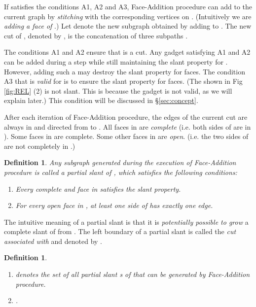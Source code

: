 \documentclass[11pt]{article}
\newtheorem{definition}[figure]{Definition}
\begin{document}
If  satisfies the conditions A1, A2 and A3, Face-Addition
procedure can add  to the current graph  by {\em stitching}
 with the corresponding vertices on . (Intuitively we are
{\em adding a face of }.) Let  denote the new subgraph
obtained by adding  to . The new cut of ,
denoted by , is the concatenation of three subpaths
.

The conditions A1 and A2 ensure that  is a cut. Any gadget
 satisfying A1 and A2 can be added during a step while still maintaining
the slant property for . However, adding such a  may destroy the
slant property for  faces. The condition A3 that  is {\em valid}
for  is to ensure the slant property for  faces. (The 
shown in Fig \ref{fig:REL} (2) is not slant. This is because the gadget
 is not valid, as we will explain later.)
This condition will be discussed in \S \ref{sec:concept}.

After each iteration of Face-Addition procedure, the edges of
the current cut  are always in  and directed from 
to . All  faces  in  are {\em complete}
(i.e. both sides of  are in ). Some  faces in
 are complete. Some other  faces  in  are
{\em open}. (i.e. the two sides of  are not completely in .)

\begin{definition}
Any subgraph  generated during the execution of
Face-Addition procedure is called a {\em partial slant}
 of , which satisfies the following conditions:
\begin{enumerate}
\item Every complete  and  face in  satisfies
the slant  property.
\item For every open  face  in , at least one
side of  has exactly one edge.
\end{enumerate}
\end{definition}

The intuitive meaning of a partial slant   is that it is
{\em potentially possible to grow} a complete slant  of  from
. The left boundary of a partial slant   is called
the {\em cut associated with}  and denoted by .

\begin{definition}
\label{def:G-tilde}
\begin{enumerate}
\item  denotes the set of all partial slant s of 
that can be generated by Face-Addition procedure.
\item .
\end{enumerate}
\end{definition}
\end{document}
